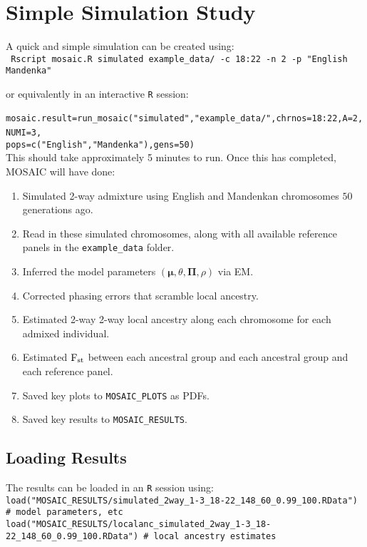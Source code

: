 \documentclass{article}
\begin{document}
\section{Simple Simulation Study}



A quick and simple simulation can be created using:\\
\verb+ Rscript mosaic.R simulated example_data/ -c 18:22 -n 2 -p "English Mandenka"+

or equivalently in an interactive \texttt{R} session:\\
\verb+ mosaic.result=run_mosaic("simulated","example_data/",chrnos=18:22,A=2,NUMI=3,+
\verb+                                pops=c("English","Mandenka"),gens=50) +\\
This should take approximately 5 minutes to run. 
Once this has completed, MOSAIC will have done:
\begin{enumerate}
  \item Simulated 2-way admixture using English and Mandenkan chromosomes $50$ generations ago.
  \item Read in these simulated chromosomes, along with all available reference panels in the \texttt{example\_data} folder.
  \item Inferred the model parameters $(\bm\mu, \theta, \bm\Pi, \rho)$ via EM.
  \item Corrected phasing errors that scramble local ancestry. 
  \item Estimated 2-way 2-way local ancestry along each chromosome for each admixed individual. 
  \item Estimated $\textrm{F}_{\textrm{st}}$ between each ancestral group and each ancestral group and each reference panel. 
  \item Saved key plots to \texttt{MOSAIC\_PLOTS} as PDFs.
  \item Saved key results to \texttt{MOSAIC\_RESULTS}.
\end{enumerate}

\subsection{Loading Results}
The results can be loaded in an \texttt{R} session using:\\
\verb+load("MOSAIC_RESULTS/simulated_2way_1-3_18-22_148_60_0.99_100.RData") # model parameters, etc+  \\
\verb+load("MOSAIC_RESULTS/localanc_simulated_2way_1-3_18-22_148_60_0.99_100.RData") # local ancestry estimates+ 
\end{document}
